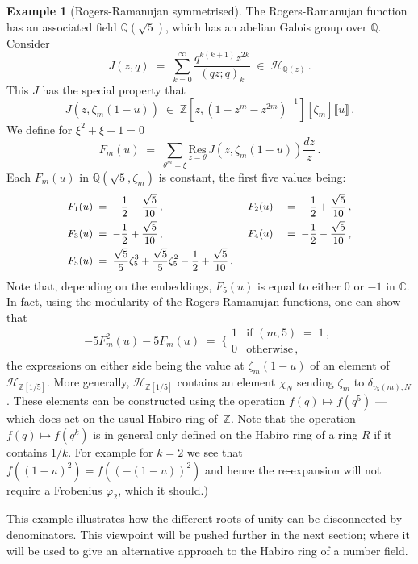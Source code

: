 \documentclass[12pt,reqno]{amsart}
\theoremstyle{definition}
\newtheorem{example}[proposition]{Example}
\def\BZ{\mathbb Z}
\def\BQ{\mathbb Q}
\def\BC{\mathbb C}
\def\calH{\mathcal H}
\def\Res#1{\underset{#1}{\mathrm{Res}}\,}
\def\th{\theta}
\def\be{\begin{equation}}
\def\ee{\end{equation}}
\def\z{\zeta}
\def\={\;=\;}
\def\inn{\;\in\;}
\begin{document}
\begin{example}[Rogers-Ramanujan symmetrised]
The Rogers-Ramanujan function has an associated field $\BQ(\sqrt{5})$, which has an
abelian Galois group over $\BQ$. Consider
\be
J(z,q) \= \sum_{k=0}^{\infty}\frac{q^{k(k+1)}z^{2k}}{(qz;q)_{k}}
\inn \calH_{\BQ(z)}\,.
\ee
This $J$ has the special property that
\be
J(z,\z_m(1-u)) \inn \BZ[z,(1-z^m-z^{2m})^{-1}][\z_m]\llbracket u\rrbracket\,.
\ee
We define for $\xi^{2}+\xi-1=0$
\be
F_{m}(u) \= \sum_{\th^{m}=\xi} \Res{z=\th} J(z,\z_m(1-u))\frac{dz}{z}\,.
\ee
Each $F_m(u)$ in $\BQ(\sqrt{5},\z_m)$ is constant, the first five values being:
\be
\begin{small}
\begin{aligned}
F_{1}(u)
&\=-\frac{1}{2}-\frac{\sqrt{5}}{10}\,,\qquad\qquad\qquad\qquad
F_{2}(u)
&\=-\frac{1}{2}+\frac{\sqrt{5}}{10}\,,\\
F_{3}(u)
&\=-\frac{1}{2}+\frac{\sqrt{5}}{10}\,,\qquad\qquad\qquad\qquad
F_{4}(u)
&\=-\frac{1}{2}-\frac{\sqrt{5}}{10}\,,\\
F_{5}(u)
&\=\frac{\sqrt{5}}{5}\z_5^3 + \frac{\sqrt{5}}{5}\z_5^2 -\frac{1}{2}
+\frac{\sqrt{5}}{10}\,.
\end{aligned}
\end{small}
\ee
Note that, depending on the embeddings, $F_5(u)$ is equal to either $0$ or $-1$ in
$\BC$. In fact, using the modularity of the Rogers-Ramanujan functions, one can show
that
\be
-5F_{m}^{2}(u)-5F_{m}(u)
\=
\bigg\{
\begin{array}{cl}
1 & \text{if }(m,5)\=1\,,\\
0 & \text{otherwise}\,,
\end{array}
\ee
the expressions on either side being the value at $\z_m(1-u)$ of an element of
$\calH_{\BZ[1/5]}$. More generally, $\calH_{\BZ[1/5]}$ contains an element $\chi_N$
sending $\z_m$ to $\delta_{v_{5}(m),N}$.  These elements can be constructed using the
operation $f(q)\mapsto f(q^5)$ --- which does act on
the usual Habiro ring of~$\BZ$. Note
that the operation $f(q)\mapsto f(q^k)$ is in general only defined
on the Habiro
ring of a ring $R$ if it contains $1/k$. For example for $k=2$ we see that
$f((1-u)^2)=f((-(1-u))^2)$ and hence the re-expansion will not require a Frobenius
$\varphi_2$, which it should.)

This example illustrates how the different roots of unity can be disconnected
by denominators. This viewpoint will be pushed further in the next section; where
it will be used to give an alternative approach to the Habiro ring of a number field.
\end{example}
\end{document}
